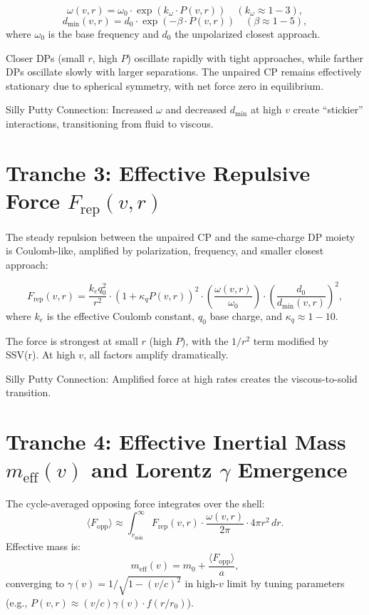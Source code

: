 \documentclass[11pt]{article}
\begin{document}
\begin{equation}
\omega(v, r) = \omega_0 \cdot \exp\left( k_\omega \cdot P(v, r) \right) \quad (k_\omega \approx 1-3),
\end{equation}
\begin{equation}
d_{\min}(v, r) = d_0 \cdot \exp\left( - \beta \cdot P(v, r) \right) \quad (\beta \approx 1-5),
\end{equation}
where $\omega_0$ is the base frequency and $d_0$ the unpolarized closest approach.

Closer DPs (small $r$, high $P$) oscillate rapidly with tight approaches, while farther DPs oscillate slowly with larger separations. The unpaired CP remains effectively stationary due to spherical symmetry, with net force zero in equilibrium.

Silly Putty Connection: Increased $\omega$ and decreased $d_{\min}$ at high $v$ create ``stickier'' interactions, transitioning from fluid to viscous.

\section{Tranche 3: Effective Repulsive Force $F_{\text{rep}}(v, r)$}

The steady repulsion between the unpaired CP and the same-charge DP moiety is Coulomb-like, amplified by polarization, frequency, and smaller closest approach:

\begin{equation}
F_{\text{rep}}(v, r) = \frac{k_e q_0^2}{r^2} \cdot (1 + \kappa_q P(v, r))^2 \cdot \left( \frac{\omega(v, r)}{\omega_0} \right) \cdot \left( \frac{d_0}{d_{\min}(v, r)} \right)^2,
\end{equation}
where $k_e$ is the effective Coulomb constant, $q_0$ base charge, and $\kappa_q \approx 1-10$.

The force is strongest at small $r$ (high $P$), with the $1/r^2$ term modified by SSV(r). At high $v$, all factors amplify dramatically.

Silly Putty Connection: Amplified force at high rates creates the viscous-to-solid transition.

\section{Tranche 4: Effective Inertial Mass $m_{\text{eff}}(v)$ and Lorentz $\gamma$ Emergence}

The cycle-averaged opposing force integrates over the shell:
\begin{equation}
\langle F_{\text{opp}} \rangle \approx \int_{r_{\min}}^\infty F_{\text{rep}}(v, r) \cdot \frac{\omega(v, r)}{2\pi} \cdot 4\pi r^2 \, dr.
\end{equation}
Effective mass is:
\begin{equation}
m_{\text{eff}}(v) = m_0 + \frac{\langle F_{\text{opp}} \rangle}{a},
\end{equation}
converging to $\gamma(v) = 1 / \sqrt{1 - (v/c)^2}$ in high-$v$ limit by tuning parameters (e.g., $P(v, r) \approx (v/c) \gamma(v) \cdot f(r/r_0)$).
\end{document}
